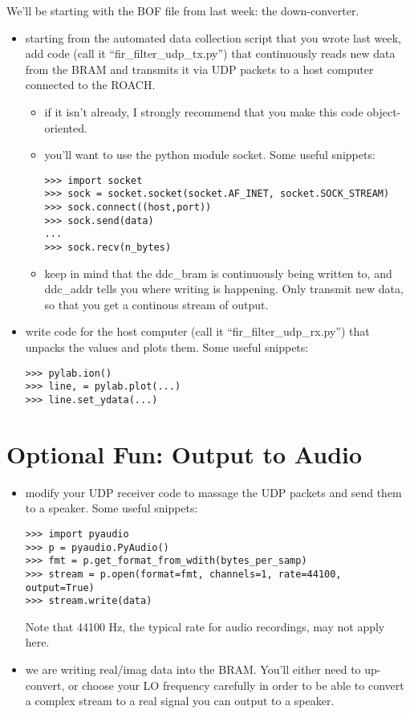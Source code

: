 \documentclass[11pt]{article}
\begin{document}
We'll be starting with the BOF file from last week: the down-converter.

\begin{itemize}
\item starting from the automated data collection script that you wrote last week, add code (call it
``fir\_filter\_udp\_tx.py'') that continuously
reads new data from the BRAM and transmits it via UDP packets to a host computer connected to the ROACH.
\begin{itemize}
\item if it isn't already, I strongly recommend that you make this code object-oriented.
\item you'll want to use the python module socket.  Some useful snippets:
\begin{verbatim}
>>> import socket
>>> sock = socket.socket(socket.AF_INET, socket.SOCK_STREAM)
>>> sock.connect((host,port))
>>> sock.send(data)
...
>>> sock.recv(n_bytes)
\end{verbatim}
\item keep in mind that the ddc\_bram is continuously being written to, and ddc\_addr tells you where writing
is happening.  Only transmit new data, so that you get a continous stream of output.

\end{itemize}
\item write code for the host computer (call it ``fir\_filter\_udp\_rx.py'') that unpacks the values and 
plots them.  Some useful snippets:
\begin{verbatim}
>>> pylab.ion()
>>> line, = pylab.plot(...)
>>> line.set_ydata(...)
\end{verbatim}
\end{itemize}

\section{Optional Fun: Output to Audio}
\begin{itemize}
\item modify your UDP receiver code to massage the UDP packets and send them to a speaker.  Some useful snippets:
\begin{verbatim}
>>> import pyaudio
>>> p = pyaudio.PyAudio()
>>> fmt = p.get_format_from_wdith(bytes_per_samp)
>>> stream = p.open(format=fmt, channels=1, rate=44100, output=True)
>>> stream.write(data)
\end{verbatim}
Note that 44100 Hz, the typical rate for audio recordings, may not apply here.
\item we are writing real/imag data into the BRAM.  You'll either need to up-convert, or choose your LO
frequency carefully in order to be able to convert a complex stream to a real signal you can output to a speaker.
\end{itemize}
\end{document}
